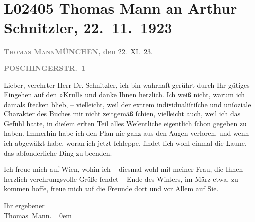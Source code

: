 

\section[Thomas Mann an Arthur Schnitzler, 22. 11. 1923]{L02405 Thomas Mann an Arthur Schnitzler, 22. 11. 1923}
\nopagebreak{}
\rehead{ }\normalsize\beginnumbering{}
\toendnotes[C]{\smallbreak\pagebreak[2]}
\toendnotes[C]{\smallbreak}
\pstart
           {\pb}\textcolor{gray}{\textbf{\textsc{Thomas Mann}}}\hfill \textcolor{gray}{\textbf{MÜNCHEN, den}}{ }22. XI. 23.\pend
           
\pstart
           \raggedleft{}\textcolor{gray}{\textbf{POSCHINGERSTR. 1}}\pend
           
\pstart{}Lieber, verehrter Herr Dr. Schnitzler,\pend\vspace{0.5em}
\pstart
           ich bin wahrhaft gerührt durch Ihr gütiges Eingehen auf den »Krull« und danke Ihnen herzlich. Ich weiß nicht, warum ich damals
               ſtecken blieb, – vielleicht, weil der extrem individualiſtiſche und unſoziale
               Charakter des Buches mir nicht zeitgemäß ſchien, vielleicht auch, weil ich das Gefühl
               hatte, in dieſem erſten Teil alles We{\pb}ſentliche eigentlich
               ſchon gegeben zu haben. Immerhin habe ich den Plan nie ganz aus den Augen verloren,
               und wenn ich abgewälzt habe, woran ich jetzt ſchleppe, findet ſich wohl einmal die
               Laune, das abſonderliche Ding zu beenden.\pend
           
\pstart
           Ich freue mich auf Wien, wohin ich – diesmal wohl
               mit meiner Frau, die Ihnen
               herzlich verehrungsvolle Grüße ſendet – Ende des Winters, im März etwa,
               zu kommen hoffe, freue mich auf die Freunde dort und vor Allem auf Sie.\pend
           
\pstart
           Ihr ergebener{\\[\baselineskip]}\spacefill\mbox{Thomas Mann.}\pend
           \leftskip=0em{}\endnumbering{}  
      